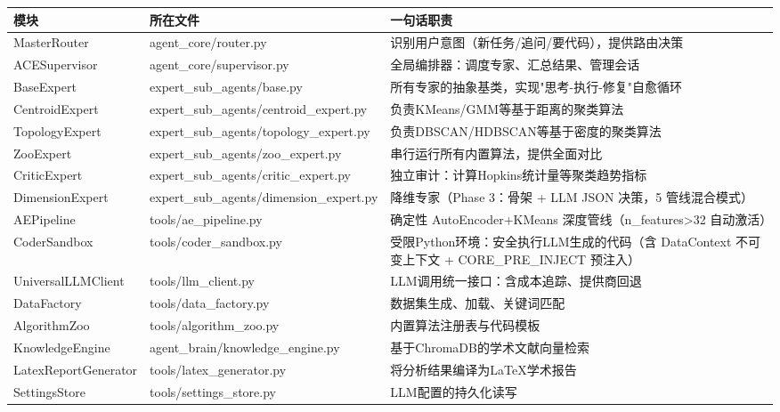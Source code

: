 \documentclass[11pt,a4paper]{ctexbook}
\begin{document}
\begin{longtable}{p{3cm} p{2.5cm} p{7.5cm}}
    \toprule
    \textbf{模块} & \textbf{所在文件} & \textbf{一句话职责} \\
    \midrule
    MasterRouter & agent\_core/router.py & 识别用户意图（新任务/追问/要代码），提供路由决策 \\
    \midrule
    ACESupervisor & agent\_core/supervisor.py & 全局编排器：调度专家、汇总结果、管理会话 \\
    \midrule
    BaseExpert & expert\_sub\_agents/base.py & 所有专家的抽象基类，实现"思考-执行-修复"自愈循环 \\
    \midrule
    CentroidExpert & expert\_sub\_agents/centroid\_expert.py & 负责KMeans/GMM等基于距离的聚类算法 \\
    \midrule
    TopologyExpert & expert\_sub\_agents/topology\_expert.py & 负责DBSCAN/HDBSCAN等基于密度的聚类算法 \\
    \midrule
    ZooExpert & expert\_sub\_agents/zoo\_expert.py & 串行运行所有内置算法，提供全面对比 \\
    \midrule
    CriticExpert & expert\_sub\_agents/critic\_expert.py & 独立审计：计算Hopkins统计量等聚类趋势指标 \\
    \midrule
    DimensionExpert & expert\_sub\_agents/dimension\_expert.py & 降维专家（Phase 3：骨架 + LLM JSON 决策，5 管线混合模式）\\
    \midrule
    AEPipeline & tools/ae\_pipeline.py & 确定性 AutoEncoder+KMeans 深度管线（n\_features>32 自动激活）\\
    \midrule
    CoderSandbox & tools/coder\_sandbox.py & 受限Python环境：安全执行LLM生成的代码（含 DataContext 不可变上下文 + CORE\_PRE\_INJECT 预注入）\\
    \midrule
    UniversalLLMClient & tools/llm\_client.py & LLM调用统一接口：含成本追踪、提供商回退 \\
    \midrule
    DataFactory & tools/data\_factory.py & 数据集生成、加载、关键词匹配 \\
    \midrule
    AlgorithmZoo & tools/algorithm\_zoo.py & 内置算法注册表与代码模板 \\
    \midrule
    KnowledgeEngine & agent\_brain/knowledge\_engine.py & 基于ChromaDB的学术文献向量检索 \\
    \midrule
    LatexReportGenerator & tools/latex\_generator.py & 将分析结果编译为LaTeX学术报告 \\
    \midrule
    SettingsStore & tools/settings\_store.py & LLM配置的持久化读写 \\
    \bottomrule
\end{longtable}
\end{document}
